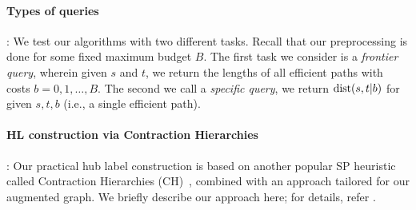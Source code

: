 %

\paragraph{Types of queries}:
We test our algorithms with two different tasks.
Recall that our preprocessing is done for some fixed maximum budget $B$.
The first task we consider is a \emph{frontier query}, wherein given $s$ and $t$, we return the lengths of all efficient paths with costs $b=0,1,\ldots,B$.
The second we call a \emph{specific query}, we return $\mbox{dist}(s,t|b)$ for given $s,t,b$ (i.e., a single efficient path).
%
%

\paragraph{HL construction via Contraction Hierarchies}:
Our practical hub label construction is based on another popular SP heuristic called Contraction Hierarchies (CH)~\cite{hubimplem}, combined with an approach tailored for our augmented graph.
We briefly describe our approach here; for details, refer \cite{TechReport}. 

